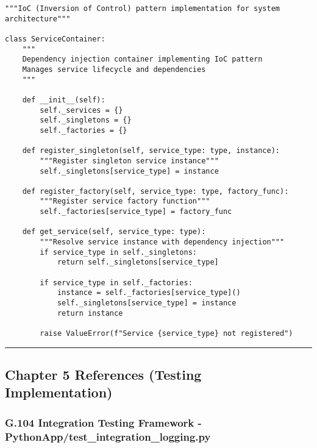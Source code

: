 \documentclass[12pt,a4paper]{article}
\begin{document}
\begin{verbatim}
"""IoC (Inversion of Control) pattern implementation for system architecture"""

class ServiceContainer:
    """
    Dependency injection container implementing IoC pattern
    Manages service lifecycle and dependencies
    """
    
    def __init__(self):
        self._services = {}
        self._singletons = {}
        self._factories = {}
    
    def register_singleton(self, service_type: type, instance):
        """Register singleton service instance"""
        self._singletons[service_type] = instance
    
    def register_factory(self, service_type: type, factory_func):
        """Register service factory function"""
        self._factories[service_type] = factory_func
    
    def get_service(self, service_type: type):
        """Resolve service instance with dependency injection"""
        if service_type in self._singletons:
            return self._singletons[service_type]
        
        if service_type in self._factories:
            instance = self._factories[service_type]()
            self._singletons[service_type] = instance
            return instance
        
        raise ValueError(f"Service {service_type} not registered")
\end{verbatim}

\hrule

\subsection{Chapter 5 References (Testing Implementation)}

\subsubsection{G.104 Integration Testing Framework - PythonApp/test_integration_logging.py}
\end{document}
